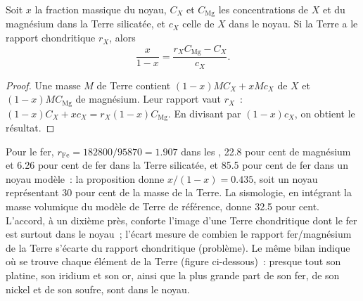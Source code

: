 \begin{proposition}
\label{prop:b2:elements-in-the-earth:core}
Soit $x$ la fraction massique du noyau, $C_X$ et $C_{\mathrm{Mg}}$ les
concentrations de $X$ et du magnésium dans la Terre silicatée, et $c_X$ celle
de $X$ dans le noyau. Si la Terre a le rapport chondritique $r_X$, alors
\[
  \frac{x}{1-x} = \frac{r_X C_{\mathrm{Mg}} - C_X}{c_X}.
\]
\end{proposition}

\begin{proof}
Une masse $M$ de Terre contient $(1-x)MC_X + xMc_X$ de
$X$ et $(1-x)MC_{\mathrm{Mg}}$ de magnésium. Leur rapport
vaut $r_X$~: $(1-x)C_X + xc_X = r_X(1-x)C_{\mathrm{Mg}}$.
En divisant par $(1-x)c_X$, on obtient le résultat.
\end{proof}

Pour le fer, $r_{\mathrm{Fe}} = \num{182800}/\num{95870} = 1.907$ dans les , 22.8 pour cent de magnésium et 6.26 pour cent de fer dans la Terre silicatée, et 85.5
pour cent de fer dans un noyau modèle~: la proposition donne $x/(1-x) = 0.435$, soit
un noyau représentant 30 pour cent de la masse de la Terre. La sismologie, en intégrant
la masse volumique du modèle de Terre de référence, donne 32.5 pour cent. L'accord, à
un dixième près, conforte l'image d'une Terre chondritique dont le fer est surtout dans
le noyau~; l'écart mesure de combien le rapport fer/magnésium de la Terre s'écarte du
rapport chondritique (problème). Le même bilan indique où se trouve chaque élément de
la Terre (figure ci-dessous)~: presque tout son platine, son iridium et son or, ainsi
que la plus grande part de son fer, de son nickel et de son soufre, sont dans le noyau.

